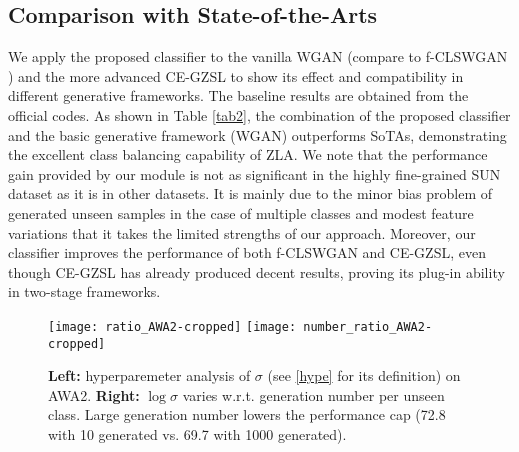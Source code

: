 \documentclass{article}
\begin{document}
	\subsection{Comparison with State-of-the-Arts}
We apply the proposed classifier to the vanilla WGAN (compare to f-CLSWGAN \cite{xian2018feature}) and the more advanced CE-GZSL \cite{han2021contrastive} to show its effect and compatibility in different generative frameworks. The baseline results are obtained from the official codes. As shown in Table \ref{tab2}, the combination of the proposed classifier and the basic generative framework (WGAN) outperforms SoTAs, demonstrating the excellent class balancing capability of ZLA. We note that the performance gain provided by our module is not as significant in the highly fine-grained SUN dataset as it is in other datasets. It is mainly due to the minor bias problem of generated unseen samples in the case of multiple classes and modest feature variations that it takes the limited strengths of our approach. Moreover, our classifier improves the performance of both f-CLSWGAN and CE-GZSL, even though CE-GZSL has already produced decent results, proving its plug-in ability in two-stage frameworks.
       \begin{figure}[t]
		\centering
		\subfigure 
		{
			\texttt{[image: ratio\_AWA2-cropped]}
		}
        \subfigure 
		{
			\texttt{[image: number\_ratio\_AWA2-cropped]}
		}
		\vspace{-2.9ex}
		\caption{{\bf Left:} hyperparemeter analysis of $\sigma$ (see \ref{hype} for its definition) on AWA2. {\bf Right:} $\log\sigma$ varies w.r.t. generation number per unseen class. Large generation number lowers the performance cap (72.8 with 10 generated vs. 69.7 with 1000 generated).}
		\vspace{-2ex}
		\label{fig3}
	\end{figure}
\end{document}

